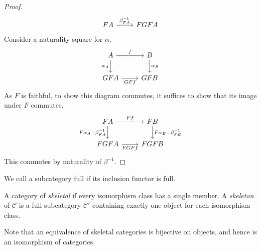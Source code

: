 \begin{proof}
\[\begin{tikzcd}
        FA & FGFA
        \arrow["{\beta_{FA}^{-1}}", from=1-1, to=1-2]
    \end{tikzcd}\]
    Consider a naturality square for \( \alpha \).
    \[\begin{tikzcd}
        A & B \\
        GFA & GFB
        \arrow["f", from=1-1, to=1-2]
        \arrow["{\alpha_B}", from=1-2, to=2-2]
        \arrow["{\alpha_A}"', from=1-1, to=2-1]
        \arrow["GFf"', from=2-1, to=2-2]
    \end{tikzcd}\]
    As \( F \) is faithful, to show this diagram commutes, it suffices to show that its image under \( F \) commutes.
    \[\begin{tikzcd}
        FA & FB \\
        FGFA & FGFB
        \arrow["Ff", from=1-1, to=1-2]
        \arrow["{F\alpha_B = \beta_{FB}^{-1}}", from=1-2, to=2-2]
        \arrow["{F\alpha_A = \beta_{FA}^{-1}}"', from=1-1, to=2-1]
        \arrow["FGFf"', from=2-1, to=2-2]
    \end{tikzcd}\]
    This commutes by naturality of \( \beta^{-1} \).
\end{proof}
We call a subcategory full if its inclusion functor is full.
\begin{definition}
    A category of \emph{skeletal} if every isomorphism class has a single member.
    A \emph{skeleton} of \( \mathcal C \) is a full subcategory \( \mathcal C' \) containing exactly one object for each isomorphism class.
\end{definition}
Note that an equivalence of skeletal categories is bijective on objects, and hence is an isomorphism of categories.


